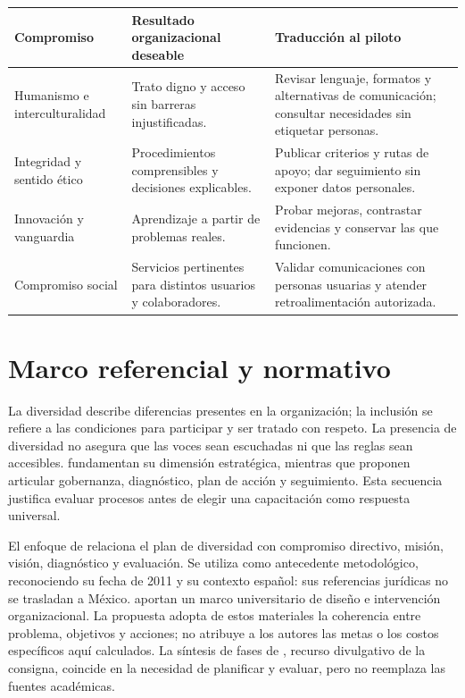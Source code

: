 \documentclass[12pt,letterpaper,oneside]{article}
\begin{document}
\begin{longtable}{@{}L{.23\textwidth}L{.35\textwidth}L{.35\textwidth}@{}}
\toprule \textbf{Compromiso} & \textbf{Resultado organizacional deseable} & \textbf{Traducción al piloto} \\
\midrule\endhead
Humanismo e interculturalidad & Trato digno y acceso sin barreras injustificadas. & Revisar lenguaje, formatos y alternativas de comunicación; consultar necesidades sin etiquetar personas. \\
Integridad y sentido ético & Procedimientos comprensibles y decisiones explicables. & Publicar criterios y rutas de apoyo; dar seguimiento sin exponer datos personales. \\
Innovación y vanguardia & Aprendizaje a partir de problemas reales. & Probar mejoras, contrastar evidencias y conservar las que funcionen. \\
Compromiso social & Servicios pertinentes para distintos usuarios y colaboradores. & Validar comunicaciones con personas usuarias y atender retroalimentación autorizada. \\
\bottomrule
\end{longtable}

\section{Marco referencial y normativo}
La diversidad describe diferencias presentes en la organización; la inclusión se refiere a las condiciones para participar y ser tratado con respeto. La presencia de diversidad no asegura que las voces sean escuchadas ni que las reglas sean accesibles. \textcite{fga10sanchez} fundamentan su dimensión estratégica, mientras que \textcite{fga10accion} proponen articular gobernanza, diagnóstico, plan de acción y seguimiento. Esta secuencia justifica evaluar procesos antes de elegir una capacitación como respuesta universal.

El enfoque de \textcite{fga10red} relaciona el plan de diversidad con compromiso directivo, misión, visión, diagnóstico y evaluación. Se utiliza como antecedente metodológico, reconociendo su fecha de 2011 y su contexto español: sus referencias jurídicas no se trasladan a México. \textcite{fga10peine} aportan un marco universitario de diseño e intervención organizacional. La propuesta adopta de estos materiales la coherencia entre problema, objetivos y acciones; no atribuye a los autores las metas o los costos específicos aquí calculados. La síntesis de fases de \textcite{fga10terapify}, recurso divulgativo de la consigna, coincide en la necesidad de planificar y evaluar, pero no reemplaza las fuentes académicas.
\end{document}
